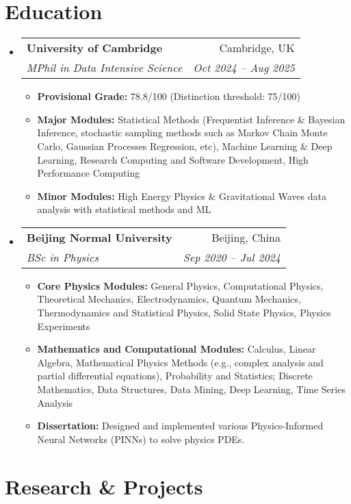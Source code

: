\documentclass[a4paper,11pt]{article}
\makeatletter
\newcommand{\resumeItem}[1]{
  \item\small{
    {#1 \vspace{-2pt}}
  }
}
\newcommand{\resumeSubheading}[4]{
  \vspace{-2pt}\item
    \begin{tabular*}{0.97\textwidth}[t]{l@{\extracolsep{\fill}}r}
      \textbf{#1} & #2 \\
      \textit{\small#3} & \textit{\small #4} \\
    \end{tabular*}\vspace{-7pt}
}
\newcommand{\resumeSubHeadingListStart}{\begin{itemize}[leftmargin=0.15in, label={}]}
\newcommand{\resumeSubHeadingListEnd}{\end{itemize}}
\newcommand{\resumeItemListStart}{\begin{itemize}}
\newcommand{\resumeItemListEnd}{\end{itemize}\vspace{-5pt}}
\makeatother
\begin{document}
\section{Education}
\resumeSubHeadingListStart
  \resumeSubheading
    {University of Cambridge}{Cambridge, UK}
    {MPhil in Data Intensive Science}{Oct 2024 -- Aug 2025}
    \resumeItemListStart
        \resumeItem{\textbf{Provisional Grade: } 78.8/100 (Distinction threshold: 75/100)}
        \resumeItem{\textbf{Major Modules: } Statistical Methods (Frequentist Inference \& Bayesian Inference, stochastic sampling methods such as Markov Chain Monte Carlo, Gaussian Processes Regression, etc), Machine Learning \& Deep Learning, Research Computing and Software Development, High Performance Computing}
        \resumeItem{\textbf{Minor Modules: }High Energy Physics \& Gravitational Waves data analysis with statistical methods and ML}
        
    \resumeItemListEnd

  \resumeSubheading
    {Beijing Normal University}{Beijing, China}
    {BSc in Physics}{Sep 2020 -- Jul 2024}
    \resumeItemListStart


        \resumeItem{\textbf{Core Physics Modules: } General Physics, Computational Physics, Theoretical Mechanics, Electrodynamics, Quantum Mechanics, Thermodynamics and Statistical Physics, Solid State Physics, Physics Experiments}
        \resumeItem{\textbf{Mathematics and Computational Modules: } Calculus, Linear Algebra, Mathematical Physics Methods (e.g., complex analysis and partial differential equations), Probability and Statistics; Discrete Mathematics, Data Structures, Data Mining, Deep Learning, Time Series Analysis}
        \resumeItem{\textbf{Dissertation: }Designed and implemented various Physics-Informed Neural Networks (PINNs) to solve physics PDEs.}
    \resumeItemListEnd
\resumeSubHeadingListEnd




\section{Research \& Projects}
\end{document}
